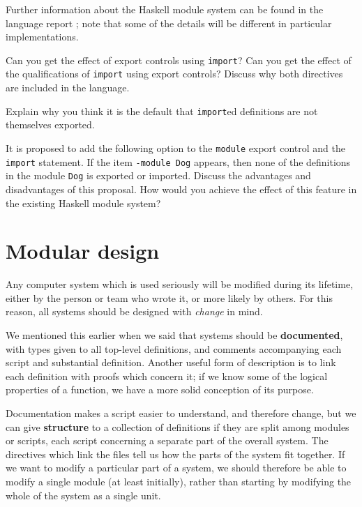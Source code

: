Further information about the Haskell module system can be found
in the language report
\cite{haskell2010};
note that some of the details will be different in particular
implementations.



\begin{exercises}

\item
Can you get the effect of export controls using \texttt{import}? Can you get
the effect of the qualifications of \texttt{import} using export controls?
Discuss why both directives are included in the language.

\item
Explain why you think it is the default that \texttt{import}ed definitions
are not themselves exported.

\item
It is proposed to add the following option to the \texttt{module} export
control and the \texttt{import} statement.
If the item \texttt{-module Dog}
appears, then none of the definitions in the module \texttt{Dog} is exported or
imported. Discuss the advantages and disadvantages of this proposal. How would
you achieve the effect of this feature in the existing Haskell module system?
\end{exercises}

\section{Modular design}

Any computer system which is used seriously will be modified during its
lifetime, either by the person or team who wrote it, or more likely by
others.
For this reason, all systems should be designed with {\em change\/} in mind. 

We
mentioned this earlier when we said that systems should be \textbf{documented}, with
types given to all top-level definitions, and comments accompanying each
script and substantial definition. Another useful form of description is to
link each definition with proofs which concern it; if we know some of the
logical properties of a function, we have a more solid conception of its
purpose.

Documentation makes a script easier to understand, and therefore change, but
we can give \textbf{structure} to a collection of definitions if they are split
among modules or scripts, each script concerning a separate part of
the overall system. The directives which link the files tell us how the parts
of the system fit together. If we want to modify a particular part of a
system, we should therefore be able to modify a single module (at least
initially), rather than starting by modifying the whole of the
system as a single unit.

